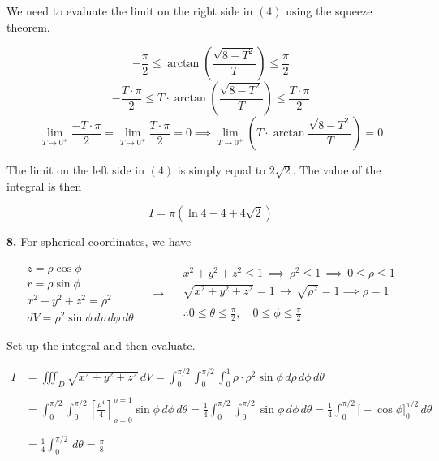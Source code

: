 \documentclass{article}
\begin{document}
We need to evaluate the limit on the right side in $(4)$ using the squeeze theorem.

\[-\frac\pi2\leq\arctan\left(\frac{\sqrt{8-T^2}}T\right)\leq\frac\pi2\]
\[-\frac{T\cdot\pi}2\leq T\cdot\arctan\left(\frac{\sqrt{8-T^2}}T\right)\leq\frac{T\cdot\pi}2\]
\[\lim_{T\to0^+}\frac{-T\cdot\pi}2=\lim_{T\to0^+}\frac{T\cdot\pi}2=0\implies\lim_{T\to0^+}\left(T\cdot\arctan\frac{\sqrt{8-T^2}}T\right)=0\]

\newpage

The limit on the left side in $(4)$ is simply equal to $2\sqrt2$. The value of the integral is then

\[\boxed{{I}=\pi\left(\ln4-4+4\sqrt2\right)}\]

\vspace{1em}

\textbf{8.} For spherical coordinates, we have

\[
\begin{array}{c}
z=\rho\cos\phi\\
r=\rho\sin\phi\\
x^2+y^2+z^2=\rho^2\\
dV=\rho^2\sin\phi\,d\rho\,d\phi\,d\theta
\end{array}\quad\rightarrow\quad
\begin{array}{c}
x^2+y^2+z^2\leq1\,\implies\,\rho^2\leq1\,\implies\,0\leq\rho\leq1\\
\sqrt{x^2+y^2+z^2}=1\,\rightarrow\,\sqrt{\rho^2}=1\implies\rho=1\\\\
\displaystyle\therefore0\leq\theta\leq\frac\pi2,\quad0\leq\phi\leq\frac\pi2
\end{array}
\]

Set up the integral and then evaluate.

\begin{align*}
{I}&=\iiint_D\sqrt{x^2+y^2+z^2}\,dV=\int_0^{\pi/2}\int_0^{\pi/2}\int_0^1\rho\cdot\rho^2\sin\phi\,d\rho\,d\phi\,d\theta\\\\&=\int_0^{\pi/2}\int_0^{\pi/2}\left[\frac{\rho^4}4\right]_{\rho=0}^{\rho=1}\sin\phi\,d\phi\,d\theta=\frac14\int_0^{\pi/2}\int_0^{\pi/2}\sin\phi\,d\phi\,d\theta=\frac14\int_0^{\pi/2}\bigg[-\cos\phi\bigg]_0^{\pi/2}\,d\theta\\\\&=\frac14\int_0^{\pi/2}\,d\theta=\boxed{\frac\pi8}
\end{align*}
\end{document}
